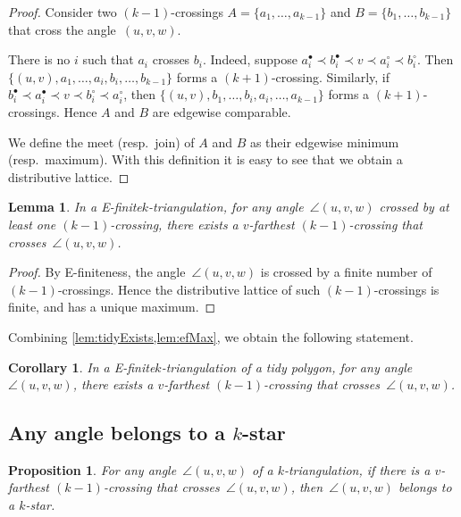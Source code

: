 \documentclass{amsart}
\newtheorem{proposition}[theorem]{Proposition}
\newtheorem{lemma}[theorem]{Lemma}
\newtheorem{corollary}[theorem]{Corollary}
\theoremstyle{remark}
\newcommand*{\ef}[0]{E-finite\xspace}
\newcommand*{\ktg}[0]{$k$-triangulation\xspace}
\newcommand{\cl}{\prec}
\begin{document}
\begin{proof}
Consider two $(k-1)$-crossings $A = \{a_1, \dots, a_{k-1}\}$ and $B = \{b_1, \dots, b_{k-1}\}$ that cross the angle~$(u,v,w)$.

There is no $i$ such that $a_i$ crosses $b_i$. 
Indeed, suppose $a^\bullet_i \cl b^\bullet_i \cl v \cl a^\circ_i \cl b^\circ_i$. Then $\{(u, v), a_1, \dots, a_i, b_i, \dots, b_{k-1}\}$ forms a $(k+1)$-crossing. 
Similarly, if $b^\bullet_i \cl a^\bullet_i \cl v \cl b^\circ_i \cl a^\circ_i$, then $\{(u, v), b_1, \dots, b_i, a_i, \dots, a_{k-1}\}$ forms a $(k+1)$-crossings.
Hence $A$ and $B$ are edgewise comparable.

We define the meet (resp.~join) of $A$ and $B$ as their edgewise minimum (resp.~maximum). With this definition it is easy to see that we obtain a distributive lattice.
\end{proof}

\begin{lemma}
\label{lem:efMax}
In a \ef \ktg, for any angle~$\angle(u,v,w)$ crossed by at least one $(k-1)$-crossing, there exists a $v$-farthest $(k-1)$-crossing that crosses~$\angle(u,v,w)$.
\end{lemma}

\begin{proof}
By \ef{}ness, the angle~$\angle(u,v,w)$ is crossed by a finite number of $(k-1)$-crossings. Hence the distributive lattice of such $(k-1)$-crossings is finite, and has a unique maximum.
\end{proof}

Combining \cref{lem:tidyExists,lem:efMax}, we obtain the following statement.

\begin{corollary}
\label{coro:farthestTidy}
In a \ef \ktg of a tidy polygon, for any angle~$\angle(u,v,w)$, there exists a $v$-farthest $(k-1)$-crossing that crosses~$\angle(u,v,w)$.
\end{corollary}


\subsection{Any angle belongs to a $k$-star}

\begin{proposition}
\label{prop:angleBelongStar}
For any angle~$\angle(u,v,w)$ of a \ktg, if there is a $v$-farthest $(k-1)$-crossing that crosses~$\angle(u,v,w)$, then~$\angle(u,v,w)$ belongs to a $k$-star.
\end{proposition}
\end{document}
